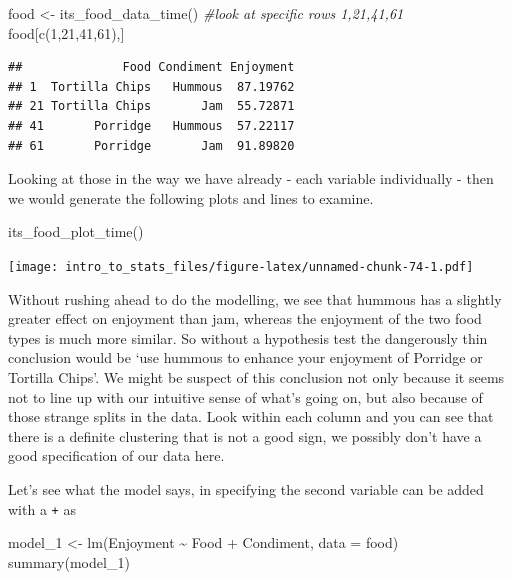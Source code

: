 \documentclass[
]{book}
\newenvironment{Shaded}{\begin{snugshade}}{\end{snugshade}}
\newcommand{\AttributeTok}[1]{\textcolor[rgb]{0.77,0.63,0.00}{#1}}
\newcommand{\CommentTok}[1]{\textcolor[rgb]{0.56,0.35,0.01}{\textit{#1}}}
\newcommand{\DecValTok}[1]{\textcolor[rgb]{0.00,0.00,0.81}{#1}}
\newcommand{\FunctionTok}[1]{\textcolor[rgb]{0.00,0.00,0.00}{#1}}
\newcommand{\NormalTok}[1]{#1}
\newcommand{\OtherTok}[1]{\textcolor[rgb]{0.56,0.35,0.01}{#1}}
\newcommand{\SpecialCharTok}[1]{\textcolor[rgb]{0.00,0.00,0.00}{#1}}
\begin{document}
\begin{Shaded}
\begin{Highlighting}[]
\NormalTok{food }\OtherTok{\textless{}{-}} \FunctionTok{its\_food\_data\_time}\NormalTok{()}
\CommentTok{\#look at specific rows 1,21,41,61}
\NormalTok{food[}\FunctionTok{c}\NormalTok{(}\DecValTok{1}\NormalTok{,}\DecValTok{21}\NormalTok{,}\DecValTok{41}\NormalTok{,}\DecValTok{61}\NormalTok{),]                                      }
\end{Highlighting}
\end{Shaded}

\begin{verbatim}
##              Food Condiment Enjoyment
## 1  Tortilla Chips   Hummous  87.19762
## 21 Tortilla Chips       Jam  55.72871
## 41       Porridge   Hummous  57.22117
## 61       Porridge       Jam  91.89820
\end{verbatim}

Looking at those in the way we have already - each variable individually - then we would generate the following plots and lines to examine.

\begin{Shaded}
\begin{Highlighting}[]
\FunctionTok{its\_food\_plot\_time}\NormalTok{()}
\end{Highlighting}
\end{Shaded}

\texttt{[image: intro\_to\_stats\_files/figure-latex/unnamed-chunk-74-1.pdf]}

Without rushing ahead to do the modelling, we see that hummous has a slightly greater effect on enjoyment than jam, whereas the enjoyment of the two food types is much more similar. So without a hypothesis test the dangerously thin conclusion would be `use hummous to enhance your enjoyment of Porridge or Tortilla Chips'. We might be suspect of this conclusion not only because it seems not to line up with our intuitive sense of what's going on, but also because of those strange splits in the data. Look within each column and you can see that there is a definite clustering that is not a good sign, we possibly don't have a good specification of our data here.

Let's see what the model says, in specifying the second variable can be added with a \texttt{+} as

\begin{Shaded}
\begin{Highlighting}[]
\NormalTok{model\_1 }\OtherTok{\textless{}{-}} \FunctionTok{lm}\NormalTok{(Enjoyment }\SpecialCharTok{\textasciitilde{}}\NormalTok{ Food }\SpecialCharTok{+}\NormalTok{ Condiment, }\AttributeTok{data =}\NormalTok{ food)}
\FunctionTok{summary}\NormalTok{(model\_1)}
\end{Highlighting}
\end{Shaded}
\end{document}

